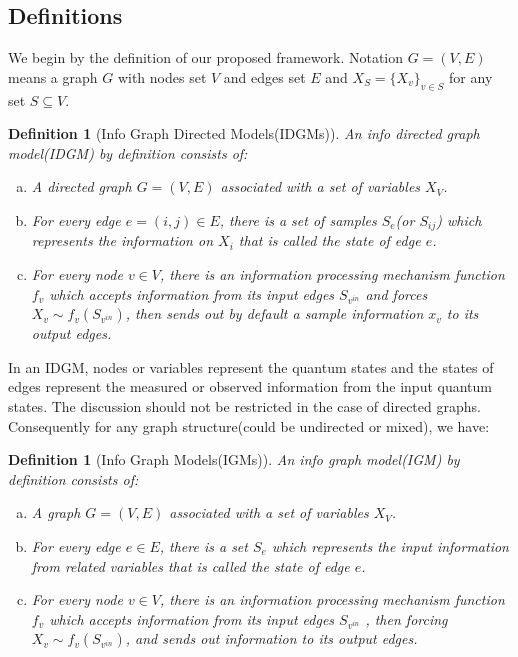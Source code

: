 \documentclass[10pt,onecolumn,letterpaper]{article}
\newtheorem{definition}[theorem]{Definition}
\begin{document}
\begin{CJK*}{UTF8}{gbsn}

\subsection{Definitions}

We begin by the definition of our proposed framework. Notation $G=(V, E)$ means a graph $G$ with nodes set $V$ and edges set $E$ and $X_S = \{X_v\}_{v\in S}$ for any set $S\subseteq V$.

\begin{definition}[Info Graph Directed Models(IDGMs)]
    An \emph{info directed graph model(IDGM)} by definition consists of:
    \begin{enumerate}[a)]
        \item  A directed graph $G = (V, E)$ associated with a set of variables $X_V$. 
        \item  For every edge $e=(i, j) \in E$, there is a set of samples $S_e$(or $S_{ij}$) which represents the information on $X_i$ that is called the state of edge $e$. 
        \item  For every node $v \in V$, there is an information processing mechanism function $f_v$ which accepts information from its input edges $S_{v^{in}}$ and forces $X_v \sim f_v(S_{v^{in}})$, then sends out by default a sample information $x_v$ to its output edges. 
    \end{enumerate}  
\end{definition}


In an IDGM, nodes or variables  represent the quantum states and the states of edges represent the measured or observed information from the input quantum states. The discussion should not be restricted in the case of directed graphs. Consequently for any graph structure(could be undirected or mixed), we have:

\begin{definition}[Info Graph Models(IGMs)]
    An \emph{info graph model(IGM)} by definition consists of:
    \begin{enumerate}[a)]
        \item  A graph $G = (V, E)$ associated with a set of variables $X_V$. 
        \item  For every edge $e \in E$, there is a set $S_e$ which represents the input information from related variables that is called the state of edge $e$. 
        \item  For every node $v \in V$, there is an information processing mechanism function $f_v$ which accepts information from its input edges $S_{v^{in}}$ , then forcing $X_v \sim f_v(S_{v^{in}})$, and sends out information to its output edges. 
    \end{enumerate}  
\end{definition}


\end{CJK*}
\end{document}
